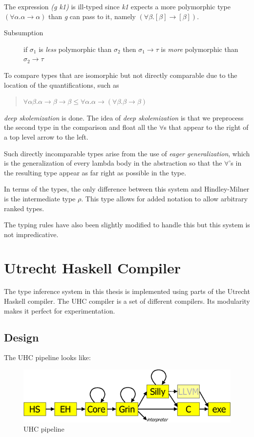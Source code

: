 \documentclass[twoside, titlepage, openright, a4paper]{book}
\renewcommand{\leq}{\leqslant}
\begin{document}
The expression \textit{(g k1)} is ill-typed since \textit{k1} expects a more polymorphic type $(\forall\alpha. \alpha \rightarrow \alpha)$ than \emph{g} can pass to it, namely $(\forall\beta.[\beta] \rightarrow [\beta])$. 

\begin{description}
\item[Subsumption] if $\sigma_1$ is \textit{less} polymorphic than $\sigma_2$ then $\sigma_1 \rightarrow \tau$ is \textit{more} polymorphic than $\sigma_2 \rightarrow \tau$
\end{description}

To compare types that are isomorphic but not directly comparable due to the location of the quantifications, such as
\begin{quotation}
$\forall\alpha\beta.\alpha\rightarrow\beta\rightarrow\beta\leq\forall\alpha.\alpha\rightarrow(\forall\beta.\beta\rightarrow\beta)$
\end{quotation}

\textit{deep skolemization} is done. The idea of \textit{deep skolemization} is that we preprocess the second type in the comparison and float all the $\forall$s that appear to the right of a top level arrow to the left.

Such directly incomparable types arise from the use of \textit{eager generalization}, which is the generalization of every lambda body in the abstraction so that the $\forall$'s in the resulting type appear as far right as possible in the type.

In terms of the types, the only difference between this system and Hindley-Milner is the intermediate type $\rho$. This type allows for added notation to allow arbitrary ranked types.

The typing rules have also been slightly modified to handle this but this system is not impredicative.

\chapter{Utrecht Haskell Compiler}
The type inference system in this thesis is implemented using parts of the Utrecht Haskell compiler. The UHC compiler is a set of different compilers. Its modularity makes it perfect for experimentation.
\section{Design}
The UHC pipeline looks like:
\begin{figure}[H]
\includegraphics[scale=0.8]{ehc-dataflow2}
\caption{UHC pipeline}
\label{flow}
\end{figure}
\end{document}
